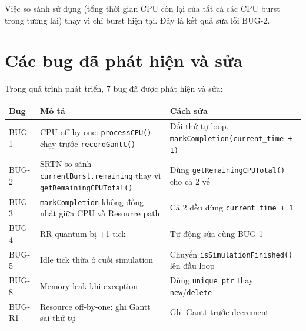 Việc so sánh sử dụng  (tổng thời gian CPU còn lại của tất cả các CPU burst trong tương lai) thay vì chỉ burst hiện tại. Đây là kết quả sửa lỗi BUG-2.

\section{Các bug đã phát hiện và sửa}

Trong quá trình phát triển, 7 bug đã được phát hiện và sửa:

\begingroup
\renewcommand{\code}[1]{\texttt{\hyphenchar\font=45\relax#1}}
\begin{longtable}{|p{2cm}|>{\raggedright}p{4cm}|>{\raggedright\hyphenchar\font=45}p{4cm}|}
\hline
\textbf{Bug} & \textbf{Mô tả} & \textbf{Cách sửa} \\
\hline
\endhead
BUG-1 & CPU off-by-one: \code{processCPU()} chạy trước \code{recordGantt()} & Đổi thứ tự loop, \linebreak[4]\code{markCompletion(current\_time + 1)} \\
\hline
BUG-2 & SRTN so sánh \code{currentBurst.remaining} thay vì \linebreak[4]\code{getRemainingCPUTotal()} & Dùng \code{getRemainingCPUTotal()} cho cả 2 vế \\
\hline
BUG-3 & \code{markCompletion} không đồng nhất giữa CPU và Resource path & Cả 2 đều dùng \code{current\_time + 1} \\
\hline
BUG-4 & RR quantum bị +1 tick & Tự động sửa cùng BUG-1 \\
\hline
BUG-5 & Idle tick thừa ở cuối simulation & Chuyển \linebreak[4]\code{isSimulationFinished()} lên đầu loop \\
\hline
BUG-8 & Memory leak khi exception & Dùng \code{unique\_ptr} thay \code{new}/\code{delete} \\
\hline
BUG-R1 & Resource off-by-one: ghi Gantt sai thứ tự & Ghi Gantt trước decrement \\
\hline
\end{longtable}
\endgroup
